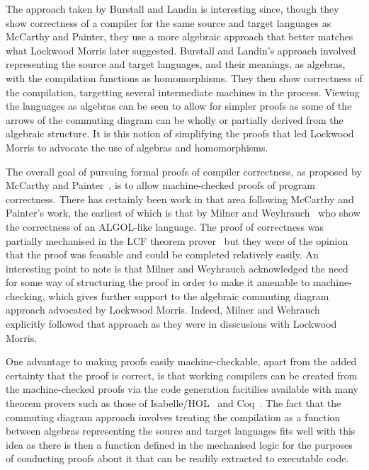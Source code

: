 \documentclass[a4paper,10pt]{report}
\begin{document}
The approach taken by Burstall and Landin is interesting since, though
they show correctness of a compiler for the same source and target languages as
McCarthy and Painter, they use a more algebraic approach that better matches
what Lockwood Morris later suggested.  Burstall and Landin's approach involved
representing the source and target languages, and their meanings, as algebras,
with the compilation functions as homomorphisms. They then show correctness of
the compilation, targetting several intermediate machines in the
process. Viewing the languages as algebras can be seen to allow for simpler
proofs as some of the arrows of the commuting diagram can be wholly or partially
derived from the algebraic structure. It is this notion of simplifying the
proofs that led Lockwood Morris to advocate the use of algebras and
homomorphisms.

The overall goal of pursuing formal proofs of compiler correctness, as proposed
by McCarthy and Painter~\cite{mccarthy1967}, is to allow machine-checked proofs
of program correctness. There has certainly been work in that area following
McCarthy and Painter's work, the earliest of which is that by Milner and
Weyhrauch~\cite{milner1972} who show the correctness of an ALGOL-like
language. The proof of correctness was partially mechanised in the LCF theorem
prover~\cite{milner1972a} but they were of the opinion that the proof was
feasable and could be completed relatively easily. An interesting point to note
is that Milner and Weyhrauch acknowledged the need for some way of structuring
the proof in order to make it amenable to machine-checking, which gives further
support to the algebraic commuting diagram approach advocated by Lockwood
Morris. Indeed, Milner and Wehrauch explicitly followed that approach as they
were in disscusions with Lockwood Morris.

One advantage to making proofs easily machine-checkable, apart from the added
certainty that the proof is correct, is that working compilers can be created
from the machine-checked proofs via the code generation facitilies available
with many theorem provers such as those of Isabelle/HOL~\cite{haftmann2007} and
Coq~\cite{letouzey2003, letouzey2008}. The fact that the commuting diagram
approach involves treating the compilation as a function between algebras
representing the source and target languages fits well with this idea as there
is then a function defined in the mechanised logic for the purposes of
conducting proofs about it that can be readily extracted to executable code.
\end{document}
